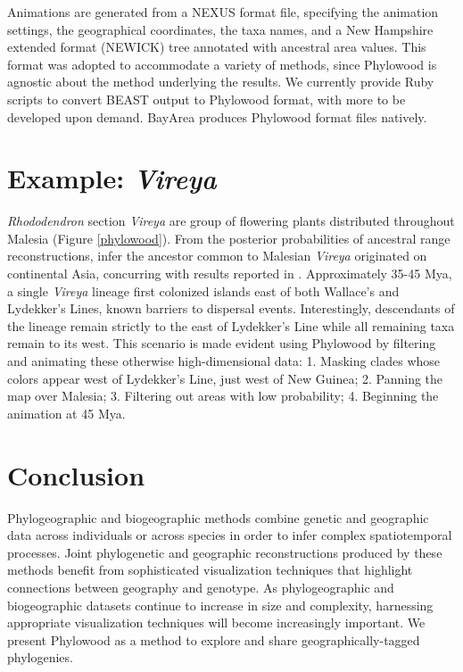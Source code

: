 \documentclass{bioinfo}
\begin{document}
Animations are generated from a NEXUS format file, specifying the animation settings, the geographical coordinates, the taxa names, and a New Hampshire extended format (NEWICK) tree annotated with ancestral area values. This format was adopted to accommodate a variety of methods, since Phylowood is agnostic about the method underlying the results. We currently provide Ruby scripts to convert BEAST output to Phylowood format, with more to be developed upon demand. BayArea produces Phylowood format files natively.

\section{Example: {\it Vireya}}

{\it Rhododendron} section {\it Vireya} are group of flowering plants distributed throughout Malesia (Figure \ref{phylowood}). From the posterior probabilities of ancestral range reconstructions, \cite{landis12} infer the ancestor common to Malesian {\it Vireya} originated on continental Asia, concurring with results reported in \cite{webb12}. Approximately 35-45 Mya, a single {\it Vireya} lineage first colonized islands east of both Wallace's and Lydekker's Lines, known barriers to dispersal events. Interestingly, descendants of the lineage remain strictly to the east of Lydekker's Line while all remaining taxa remain to its west. This scenario is made evident using Phylowood by filtering and animating these otherwise high-dimensional data: 1. Masking clades whose colors appear west of Lydekker's Line, just west of New Guinea; 2. Panning the map over Malesia; 3. Filtering out areas with low probability; 4. Beginning the animation at 45 Mya.

\section{Conclusion}

Phylogeographic and biogeographic methods combine genetic and geographic data across individuals or across species in order to infer complex spatiotemporal processes. Joint phylogenetic and geographic reconstructions produced by these methods benefit from sophisticated visualization techniques that highlight connections between geography and genotype. As phylogeographic and biogeographic datasets continue to increase in size and complexity, harnessing appropriate visualization techniques will become increasingly important. We present Phylowood as a method to explore and share geographically-tagged phylogenies. 
\end{document}
